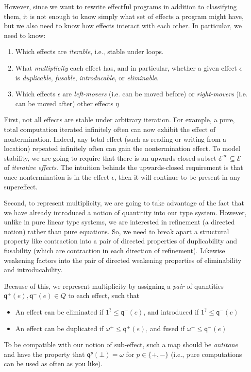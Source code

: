 \documentclass[acmsmall,screen,review]{acmart}
\newcommand{\mc}[1]{\ensuremath{\mathcal{#1}}}
\newcommand{\ms}[1]{\ensuremath{\mathsf{#1}}}
\newcommand{\delq}{1^?}
\newcommand{\cpyq}{\omega^+}
\newcommand{\topq}{\omega}
\newcommand{\alquant}{\ms{q}}
\begin{document}
However, since we want to rewrite effectful programs in addition to classifying them, it is not
enough to know simply what set of effects a program might have, but we also need to know how effects
interact with each other. In particular, we need to know:
\begin{enumerate}
  \item Which effects are \emph{iterable}, i.e., stable under loops. 
  \item What \emph{multiplicity} each effect has, and in particular, whether a given effect
  $\epsilon$ is \emph{duplicable}, \emph{fusable}, \emph{introducable}, or \emph{eliminable}.
  \item Which effects $\epsilon$ are \emph{left-movers} (i.e. can be moved before) or
  \emph{right-movers} (i.e. can be moved after) other effects $\eta$
\end{enumerate}

First, not all effects are stable under arbitrary iteration. For example, a pure, total computation
iterated infinitely often can now exhibit the effect of nontermination. Indeed, any total effect
(such as reading or writing from a location) repeated infinitely often can gain the nontermination
effect. To model stability, we are going to require that there is an upwards-closed subset
$\mc{E}^\infty \subseteq \mc{E}$ of \emph{iterative effects}. The intuition behinds the
upwards-closed requirement is that once nontermination is in the effect $\epsilon$, then it will
continue to be present in any supereffect.

Second, to represent multiplicity, we are going to take advantage of the fact that we have already
introduced a notion of quantitity into our type system.  However, unlike in pure linear type
systems, we are interested in refinement (a directed notion) rather than pure equations.  So, we
need to break apart a structural property like contraction into a pair of directed properties of
duplicability and fusability (which are contraction in each direction of refinement). Likewise
weakening factors into the pair of directed weakening properties of eliminability and
introducability.

Because of this, we represent multiplicity by assigning a \emph{pair} of quantities $\alquant^+(e),
\alquant^-(e) \in Q$ to each effect, such that
\begin{itemize}
  \item An effect can be eliminated if $\delq \leq \alquant^+(e)$, and introduced if $\delq \leq
  \alquant^-(e)$
  \item An effect can be duplicated if $\cpyq \leq \alquant^+(e)$, and fused if $\cpyq \leq
  \alquant^-(e)$
\end{itemize}
To be compatible with our notion of sub-effect, such a map should be \emph{antitone} and have
the property that $\alquant^p(\bot) = \topq$ for $p \in \{+, -\}$ (i.e., pure computations can
be used as often as you like).
\end{document}
